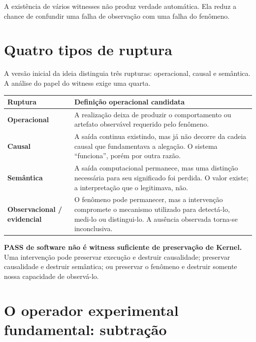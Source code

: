 \documentclass[11pt,a4paper]{article}
\begin{document}
A existência de vários witnesses não produz verdade automática. Ela reduz a chance
de confundir uma falha de observação com uma falha do fenômeno.

\section{Quatro tipos de ruptura}

A versão inicial da ideia distinguia três rupturas: operacional, causal e semântica.
A análise do papel do witness exige uma quarta.

\begin{longtable}{>{\bfseries}p{3.4cm}p{10.4cm}}
\toprule
Ruptura & Definição operacional candidata \\
\midrule
\endhead
Operacional &
A realização deixa de produzir o comportamento ou artefato observável requerido
pelo fenômeno. \\

Causal &
A saída continua existindo, mas já não decorre da cadeia causal que fundamentava a
alegação. O sistema ``funciona'', porém por outra razão. \\

Semântica &
A saída computacional permanece, mas uma distinção necessária para seu significado
foi perdida. O valor existe; a interpretação que o legitimava, não. \\

Observacional / evidencial &
O fenômeno pode permanecer, mas a intervenção compromete o mecanismo utilizado para
detectá-lo, medi-lo ou distingui-lo. A ausência observada torna-se inconclusiva. \\
\bottomrule
\end{longtable}

\begin{thesisbox}[Consequência]
\textbf{PASS de software não é witness suficiente de preservação de Kernel.}
Uma intervenção pode preservar execução e destruir causalidade; preservar causalidade
e destruir semântica; ou preservar o fenômeno e destruir somente nossa capacidade
de observá-lo.
\end{thesisbox}

\section{O operador experimental fundamental: subtração}
\end{document}
